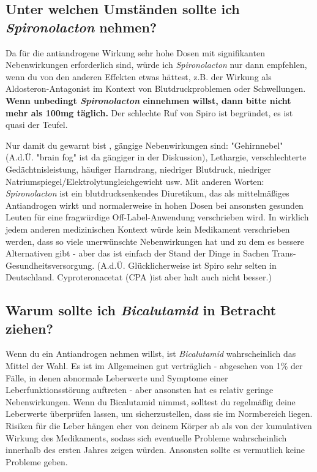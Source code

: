 \documentclass{article}
\begin{document}
\subsection{Unter welchen Umständen sollte ich \textit{Spironolacton} nehmen?}

Da für die antiandrogene Wirkung sehr hohe Dosen mit signifikanten Nebenwirkungen erforderlich sind, würde ich \textit{Spironolacton} nur dann empfehlen, wenn du von den anderen Effekten etwas hättest, z.B. der Wirkung als  Aldosteron-Antagonist im Kontext von Blutdruckproblemen oder Schwellungen. \textbf{Wenn unbedingt \textit{Spironolacton} einnehmen willst, dann bitte nicht mehr als 100mg täglich.} Der schlechte Ruf von Spiro ist begründet, es ist quasi der Teufel.

Nur damit du gewarnt bist , gängige Nebenwirkungen sind: "Gehirnnebel" (A.d.Ü. "brain fog" ist da gängiger in der Diskussion), Lethargie, verschlechterte Gedächtnisleistung, häufiger Harndrang, niedriger Blutdruck, niedriger Natriumspiegel/Elektrolytungleichgewicht usw. Mit anderen Worten: \textit{Spironolacton} ist ein blutdrucksenkendes Diuretikum, das als mittelmäßiges Antiandrogen wirkt und normalerweise in hohen Dosen bei ansonsten gesunden Leuten für eine fragwürdige Off-Label-Anwendung verschrieben wird. In wirklich jedem anderen medizinischen Kontext würde kein Medikament verschrieben werden, dass so viele unerwünschte Nebenwirkungen hat und zu dem es bessere Alternativen gibt - aber das ist einfach der Stand der Dinge in Sachen Trans-Gesundheitsversorgung. (A.d.Ü. Glücklicherweise ist Spiro sehr selten in Deutschland. Cyproteronacetat (CPA )ist aber halt auch nicht besser.)

\subsection{Warum sollte ich \textit{Bicalutamid} in Betracht ziehen?}

Wenn du ein Antiandrogen nehmen willst, ist \textit{Bicalutamid} wahrscheinlich das Mittel der Wahl. Es ist im Allgemeinen gut verträglich - abgesehen von 1\% der Fälle, in denen abnormale Leberwerte und Symptome einer Leberfunktionsstörung auftreten - aber ansonsten hat es relativ geringe Nebenwirkungen. Wenn du Bicalutamid nimmst, solltest du regelmäßig deine Leberwerte überprüfen lassen, um sicherzustellen, dass sie im Normbereich liegen. Risiken für die Leber hängen eher von deinem Körper ab als von der kumulativen Wirkung des Medikaments, sodass sich eventuelle Probleme wahrscheinlich innerhalb des ersten Jahres zeigen würden. Ansonsten sollte es vermutlich keine Probleme geben.
\end{document}
